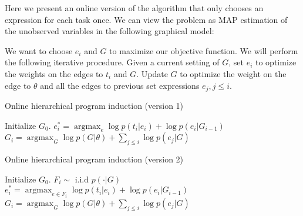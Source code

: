 \documentclass{article}
\DeclareMathOperator*{\argmax}{argmax}
\begin{document}
Here we present an online version of the algorithm that only chooses
an expression for each task once. We can view the problem as MAP
estimation of the unobserved variables in the following graphical
model:

\begin{figure}[h]
\end{figure}


We want to choose $e_i$ and $G$ to maximize our objective function. We
will perform the following iterative procedure. Given a current
setting of $G$, set $e_i$ to optimize the weights on the edges to
$t_i$ and $G$. Update $G$ to optimize the weight on the edge to
$\theta$ and all the edges to previous set expressions $e_j, j\leq
i$.

\begin{algorithm}
\caption{Online hierarchical program induction (version 1)}\label{alg:online-progind-v1}
\begin{algorithmic}
\State Initialize $G_0$.
\State $e_i^* = \argmax_{e} \log p(t_i|e_i) + \log p(e_i|G_{i-1}) $
\State $G_i = \argmax_{G} \log p(G|\theta) + \sum_{j \leq i} \log p(e_j|G) $
\EndFor
\end{algorithmic}
\end{algorithm}


\begin{algorithm}
\caption{Online hierarchical program induction (version 2)}\label{alg:online-progind-v2}
\begin{algorithmic}
\State Initialize $G_0$.
\State $F_i \sim \text{ i.i.d } p(\cdot | G)$
\State $e_i^* = \argmax_{e\in F_i} \log p(t_i|e_i) + \log p(e_i|G_{i-1}) $
\State $G_i = \argmax_{G} \log p(G|\theta) + \sum_{j \leq i} \log p(e_j|G) $
\EndFor
\end{algorithmic}
\end{algorithm}
\end{document}
